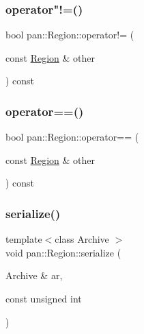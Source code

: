 \mbox{\label{classpan_1_1_region_aab9e2291f838d7cf87b2518fa2c1b8a0}} 
\subsubsection{\texorpdfstring{operator"!=()}{operator!=()}}
{\footnotesize\ttfamily bool pan\+::\+Region\+::operator!= (\begin{DoxyParamCaption}\item[{const \hyperlink{classpan_1_1_region}{Region} \&}]{other }\end{DoxyParamCaption}) const\hspace{0.3cm}{\ttfamily [inline]}}

\mbox{\label{classpan_1_1_region_a6f65b58194c83c1c1ec666c6b14c983e}} 
\subsubsection{\texorpdfstring{operator==()}{operator==()}}
{\footnotesize\ttfamily bool pan\+::\+Region\+::operator== (\begin{DoxyParamCaption}\item[{const \hyperlink{classpan_1_1_region}{Region} \&}]{other }\end{DoxyParamCaption}) const\hspace{0.3cm}{\ttfamily [inline]}}

\mbox{\label{classpan_1_1_region_af273dea05ea12be85b8bcdec0e3c22d2}} 
\subsubsection{\texorpdfstring{serialize()}{serialize()}}
{\footnotesize\ttfamily template$<$class Archive $>$ \\
void pan\+::\+Region\+::serialize (\begin{DoxyParamCaption}\item[{Archive \&}]{ar,  }\item[{const unsigned}]{int }\end{DoxyParamCaption})\hspace{0.3cm}{\ttfamily [inline]}}

